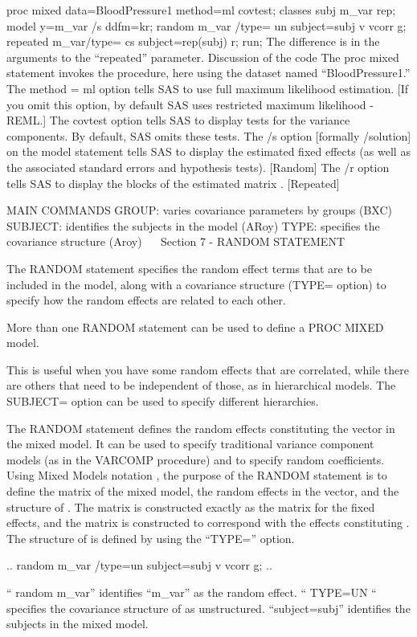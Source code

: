 proc mixed data=BloodPressure1 method=ml covtest;
classes subj m_var rep;
model y=m_var /s ddfm=kr;
random m_var /type= un subject=subj v vcorr g;
repeated m_var/type= cs subject=rep(subj) r;
run;
The difference is in the arguments to the “repeated” parameter.
Discussion of the code
The proc mixed statement invokes the procedure, here using the dataset named “BloodPressure1.”
The method = ml option tells SAS to use full maximum likelihood estimation. [If you omit this option, by default SAS uses restricted maximum likelihood - REML.]
The covtest option tells SAS to display tests for the variance components.  By default, SAS omits these tests.
The /s option [formally /solution] on the model statement tells SAS to display the estimated fixed effects (as well as the associated standard errors and hypothesis tests). [Random]
The /r option tells SAS to display the blocks of the estimated  matrix . [Repeated]

MAIN COMMANDS
GROUP:		 varies covariance parameters by groups  	(BXC)
 SUBJECT:	 identifies the subjects in the model 		(ARoy)
 TYPE: 		 specifies the covariance structure 		(Aroy)
 
Section 7 - RANDOM STATEMENT

The RANDOM statement specifies the random effect terms that are to be included in the model, along with a
covariance structure (TYPE= option) to specify how the random effects are related to each other. 

More than one RANDOM statement can be used to define a PROC MIXED model. 

This is useful when you have some random effects that are correlated, while there are others that need to be independent of those, as in hierarchical models. The SUBJECT= option can be used to specify different hierarchies.

The RANDOM statement defines the random effects constituting the   vector in the mixed model. 
It can be used to specify traditional variance component models (as in the VARCOMP procedure) and to specify random coefficients.
Using Mixed Models notation , the purpose of the RANDOM statement is to define the   matrix of the mixed model, the random effects in the  vector, and the structure of  . 
The  matrix is constructed exactly as the  matrix for the fixed effects, and the  matrix is constructed to correspond with the effects constituting  . 
The structure of  is defined by using the “TYPE=” option. 

..
random m_var /type=un subject=subj v vcorr g;
..

“ random m_var” identifies “m_var” as the random effect.
“ TYPE=UN “ specifies the covariance structure of   as unstructured.
“subject=subj” identifies the subjects in the mixed model.

